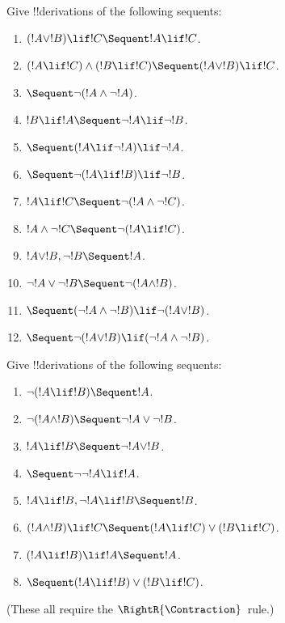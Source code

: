 \begin{prob}
Give !!{derivation}s of the following sequents:
\begin{enumerate}
\item $(!A \lor !B) \lif !C \Sequent !A \lif !C$.
\item $(!A \lif !C) \land (!B \lif !C) \Sequent (!A \lor !B) \lif !C$.
\item $\Sequent \lnot(!A \land \lnot !A)$.
\item $!B \lif !A \Sequent \lnot !A \lif \lnot !B$.
\item $\Sequent (!A \lif \lnot !A) \lif \lnot !A$.
\item $\Sequent \lnot(!A \lif !B) \lif \lnot !B$.
\item $!A \lif !C \Sequent \lnot (!A \land \lnot !C)$.
\item $!A \land \lnot !C \Sequent \lnot (!A \lif !C)$.
\item $!A \lor !B, \lnot !B \Sequent !A$.
\item $\lnot !A \lor \lnot !B \Sequent \lnot(!A \land !B)$.
\item $\Sequent (\lnot !A \land \lnot !B) \lif\lnot(!A \lor !B)$.
\item $\Sequent \lnot(!A \lor !B) \lif (\lnot !A \land \lnot !B)$.
\end{enumerate}
\end{prob}

\begin{prob}
Give !!{derivation}s of the following sequents:
\begin{enumerate}
\item $\lnot(!A \lif !B) \Sequent !A$.
\item $\lnot(!A \land !B) \Sequent \lnot !A \lor \lnot !B$.
\item $!A \lif !B \Sequent \lnot !A \lor !B$.
\item $\Sequent \lnot \lnot !A \lif !A$.
\item $!A \lif !B, \lnot !A \lif !B \Sequent !B$.
\item $(!A \land !B) \lif !C \Sequent (!A \lif !C) \lor (!B \lif !C)$.
\item $(!A \lif !B) \lif !A \Sequent !A$.
\item $\Sequent (!A \lif !B) \lor (!B \lif !C)$.
\end{enumerate}
(These all require the $\RightR{\Contraction}$~rule.)
\end{prob}






